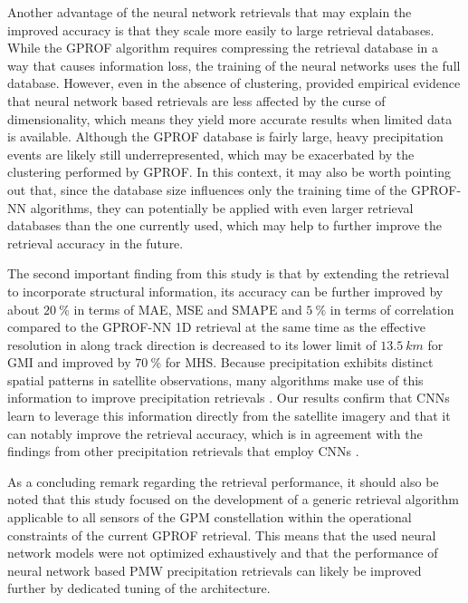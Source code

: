 \documentclass[journal abbreviation, manuscript]{copernicus}
\begin{document}
Another advantage of the neural network retrievals that may explain the improved
accuracy is that they scale more easily to large retrieval databases. While the
GPROF algorithm requires compressing the retrieval database in a way that causes
information loss, the training of the neural networks uses the full database.
However, even in the absence of clustering, \citet{pfreundschuh18}
provided empirical evidence that neural network based retrievals are less
affected by the curse of dimensionality, which means they yield more accurate
results when limited data is available. Although the GPROF database is fairly
large, heavy precipitation events are likely still underrepresented, which may
be exacerbated by the clustering performed by GPROF. In this context, it may
also be worth pointing out that, since the database size influences only the
training time of the GPROF-NN algorithms, they can potentially be applied with
even larger retrieval databases than the one currently used, which may help to
further improve the retrieval accuracy in the future.

The second important finding from this study is that by extending the retrieval
to incorporate structural information, its accuracy can be further improved by
about $20\ \unit{\%}$ in terms of MAE, MSE and SMAPE and $5\ \unit{\%}$ in terms
of correlation compared to the GPROF-NN 1D retrieval at the same time as the
effective resolution in along track direction is decreased to its lower limit of
$13.5\ \unit{km}$ for GMI and improved by $70\ \unit{\%}$ for MHS. Because
precipitation exhibits distinct spatial patterns in satellite observations, many
algorithms make use of this information to improve precipitation retrievals
\citep{kummerow94, sorooshian00, hong04, kaushik10}. Our results confirm that CNNs learn to
leverage this information directly from the satellite imagery and that it can
notably improve the retrieval accuracy, which is in agreement with the findings
from other precipitation retrievals that employ CNNs \citep{tang18, sadeghi19,
  gorooh22, sano18}.

As a concluding remark regarding the retrieval performance, it should also be
noted that this study focused on the development of a generic retrieval
algorithm applicable to all sensors of the GPM constellation within the
operational constraints of the current GPROF retrieval. This means that the used
neural network models were not optimized exhaustively and that the performance
of neural network based PMW precipitation retrievals can likely be improved
further by dedicated tuning of the architecture.
\end{document}
